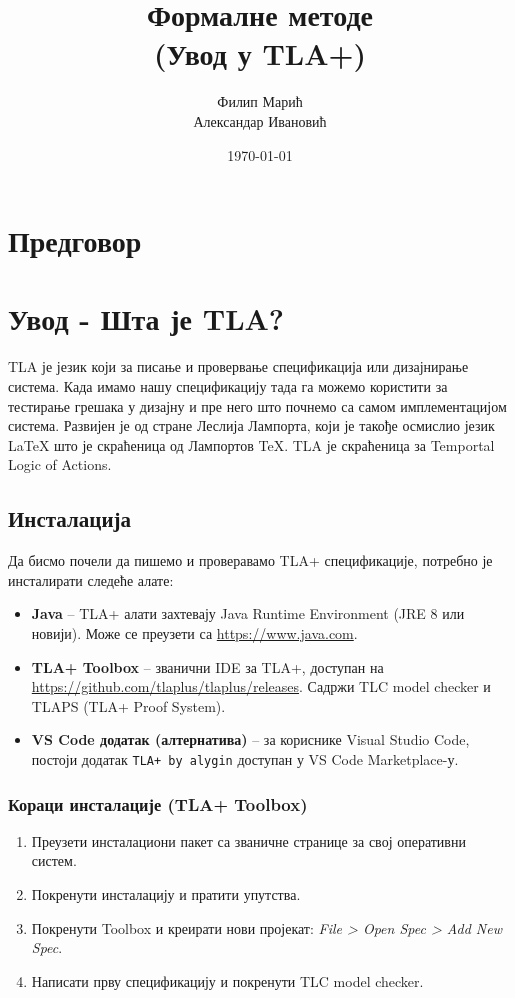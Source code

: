 \documentclass[12pt, a4paper]{article}
\title{\textbf{Формалне методе} \\ (Увод у TLA+)}
\author{Филип Марић \\ Александар Ивановић}
\date{\today}
\theoremstyle{plain}
\theoremstyle{definition}
\theoremstyle{remark}
\begin{document}
\maketitle
\newpage
\tableofcontents
\newpage
\section{Предговор}
\newpage

\section{Увод - Шта је TLA?}
TLA је језик који за писање и провервање спецификација или дизајнирање система.
Када имамо нашу спецификацију тада га можемо користити за
тестирање грешака у дизајну и пре него што почнемо са самом имплементацијом система.
Развијен је од стране Леслија Лампорта, који је такође осмислио језик \LaTeX  
што је скраћеница од Лампортов \TeX.
TLA је скраћеница за Temportal Logic of Actions.

\subsection{Инсталација}

Да бисмо почели да пишемо и проверавамо TLA+ спецификације, потребно је инсталирати следеће алате:

\begin{itemize}
    \item \textbf{Java} -- TLA+ алати захтевају Java Runtime Environment (JRE 8 или новији).
    Може се преузети са \url{https://www.java.com}.

    \item \textbf{TLA+ Toolbox} -- званични IDE за TLA+, доступан на
    \url{https://github.com/tlaplus/tlaplus/releases}.
    Садржи TLC model checker и TLAPS (TLA+ Proof System).

    \item \textbf{VS Code додатак (алтернатива)} -- за кориснике Visual Studio Code,
    постоји додатак \texttt{TLA+ by alygin} доступан у VS Code Marketplace-у.
\end{itemize}

\subsubsection{Кораци инсталације (TLA+ Toolbox)}

\begin{enumerate}
    \item Преузети инсталациони пакет са званичне странице за свој оперативни систем.
    \item Покренути инсталацију и пратити упутства.
    \item Покренути Toolbox и креирати нови пројекат: \textit{File > Open Spec > Add New Spec}.
    \item Написати прву спецификацију и покренути TLC model checker.
\end{enumerate}
\end{document}
